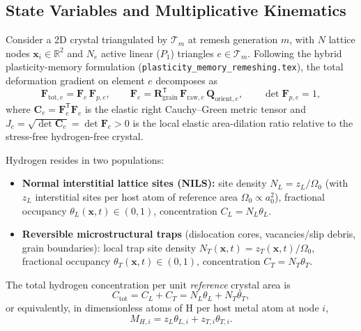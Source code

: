 \documentclass[11pt,a4paper]{article}
\newcommand{\R}{\mathbb{R}}
\newcommand{\T}{^{\mathsf T}}
\newcommand{\code}[1]{\texttt{#1}}
\begin{document}
\subsection{State Variables and Multiplicative Kinematics}

Consider a 2D crystal triangulated by $\mathcal{T}_m$ at remesh generation $m$, with $N$ lattice nodes $\mathbf{x}_i \in \R^2$ and $N_e$ active linear ($P_1$) triangles $e \in \mathcal{T}_m$. Following the hybrid plasticity-memory formulation (\code{plasticity\_memory\_remeshing.tex}), the total deformation gradient on element $e$ decomposes as
\begin{equation}
  \mathbf{F}_{\text{tot},e} = \mathbf{F}_{e}\,\mathbf{F}_{p,e}, \qquad
  \mathbf{F}_{e} = \mathbf{R}_{\text{grain}}\T\,\mathbf{F}_{\text{raw},e}\,\mathbf{Q}_{\text{orient},e}, \qquad
  \det \mathbf{F}_{p,e} = 1,
  \label{eq:fe_fp}
\end{equation}
where $\mathbf{C}_e = \mathbf{F}_e\T \mathbf{F}_e$ is the elastic right Cauchy--Green metric tensor and $J_e = \sqrt{\det \mathbf{C}_e} = \det \mathbf{F}_e > 0$ is the local elastic area-dilation ratio relative to the stress-free hydrogen-free crystal.

Hydrogen resides in two populations:
\begin{itemize}[nosep]
  \item \textbf{Normal interstitial lattice sites (NILS):} site density $N_L = z_L / \Omega_0$ (with $z_L$ interstitial sites per host atom of reference area $\Omega_0 \propto a_0^2$), fractional occupancy $\theta_L(\mathbf{x}, t) \in (0, 1)$, concentration $C_L = N_L \theta_L$.
  \item \textbf{Reversible microstructural traps} (dislocation cores, vacancies/slip debris, grain boundaries): local trap site density $N_T(\mathbf{x}, t) = z_T(\mathbf{x}, t) / \Omega_0$, fractional occupancy $\theta_T(\mathbf{x}, t) \in (0, 1)$, concentration $C_T = N_T \theta_T$.
\end{itemize}
The total hydrogen concentration per unit \emph{reference} crystal area is
\begin{equation}
  C_{\text{tot}} = C_L + C_T = N_L \theta_L + N_T \theta_T,
  \label{eq:c_tot}
\end{equation}
or equivalently, in dimensionless atoms of H per host metal atom at node $i$,
\begin{equation}
  M_{H,i} = z_L \theta_{L,i} + z_{T,i} \theta_{T,i}.
  \label{eq:m_hi}
\end{equation}
\end{document}
